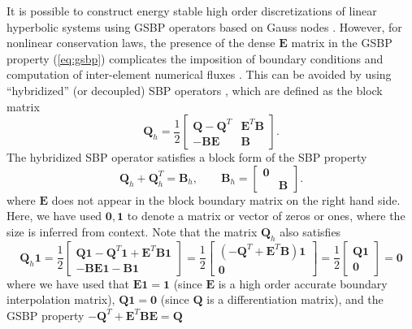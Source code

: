 \documentclass{svjour3}                     %
\newcommand{\LRp}[1]{\left( #1 \right)}
\begin{document}
It is possible to construct energy stable high order discretizations of linear hyperbolic systems using GSBP operators based on Gauss nodes \cite{fernandez2014generalized}.  However, for nonlinear conservation laws, the presence of the dense $\bm{E}$ matrix in the GSBP property (\ref{eq:gsbp}) complicates the imposition of boundary conditions and computation of inter-element numerical fluxes \cite{crean2018entropy, chan2017discretely, chan2018efficient}.  This can be avoided by using ``hybridized'' (or decoupled) SBP operators \cite{chan2017discretely, chenreview, chan2019skew}, which are defined as the block matrix 
\[
\bm{Q}_h = \frac{1}{2}\begin{bmatrix}
\bm{Q}-\bm{Q}^T & \bm{E}^T\bm{B}\\
-\bm{B}\bm{E} & \bm{B}
\end{bmatrix}.
\]
The hybridized SBP operator satisfies a block form of the SBP property
\begin{equation}
\bm{Q}_h + \bm{Q}_h^T = \bm{B}_h, \qquad \bm{B}_h =  \begin{bmatrix}
\bm{0} & \\
& \bm{B}\end{bmatrix}.
\label{eq:hsbp}
\end{equation}
where $\bm{E}$ does not appear in the block boundary matrix on the right hand side.  Here, we have used $\bm{0}, \bm{1}$ to denote a matrix or vector of zeros or ones, where the size is inferred from context.  Note that the matrix $\bm{Q}_h$ also satisfies
\begin{equation}
\bm{Q}_h\bm{1} = 
\frac{1}{2}\begin{bmatrix}
\bm{Q}\bm{1}-\bm{Q}^T\bm{1} + \bm{E}^T\bm{B}\bm{1}\\
-\bm{B}\bm{E}\bm{1} - \bm{B}\bm{1}
\end{bmatrix}= 
\frac{1}{2}\begin{bmatrix}
\LRp{-\bm{Q}^T + \bm{E}^T\bm{B}}\bm{1}\\
\bm{0}
\end{bmatrix}=
\frac{1}{2}\begin{bmatrix}
\bm{Q}\bm{1}\\
\bm{0}
\end{bmatrix} = \bm{0}
\label{eq:Qh1}
\end{equation}
where we have used that $\bm{E}\bm{1} = \bm{1}$ (since $\bm{E}$ is a high order accurate boundary interpolation matrix), $\bm{Q}\bm{1} = \bm{0}$ (since $\bm{Q}$ is a differentiation matrix), and the GSBP property $-\bm{Q}^T + \bm{E}^T\bm{B}\bm{E} = \bm{Q}$
\end{document}
